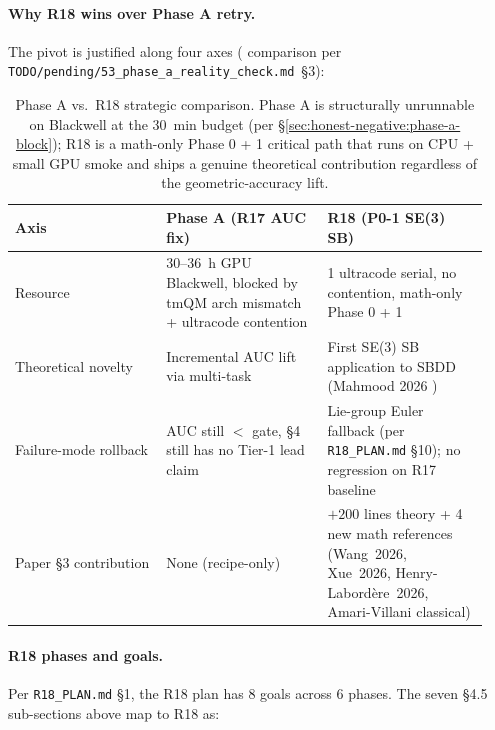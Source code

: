 \paragraph{Why R18 wins over Phase A retry.}
The pivot is justified along four axes (\MEASURED{} comparison
per \texttt{TODO/pending/53\_phase\_a\_reality\_check.md}~§3):

\begin{table}[ht]
\centering
\small
\setlength{\tabcolsep}{4pt}
\begin{tabular}{p{0.30\linewidth}p{0.32\linewidth}p{0.32\linewidth}}
\toprule
\textbf{Axis} & \textbf{Phase A (R17 AUC fix)} & \textbf{R18 (P0-1 SE(3) SB)} \\
\midrule
Resource & 30--36~h GPU Blackwell, blocked by tmQM arch mismatch + ultracode contention & 1 ultracode serial, no contention, math-only Phase 0 + 1 \\
Theoretical novelty & Incremental AUC lift via multi-task & First SE(3) SB application to SBDD (Mahmood 2026 \cite{mahmood2026sb_lie}) \\
Failure-mode rollback & AUC still $<$ gate, §4 still has no Tier-1 lead claim & Lie-group Euler fallback (per \texttt{R18\_PLAN.md} §10); no regression on R17 baseline \\
Paper §3 contribution & None (recipe-only) & $+200$ lines theory + 4 new math references (Wang~2026, Xue~2026, Henry-Labord\`ere~2026, Amari-Villani classical) \\
\bottomrule
\end{tabular}
\caption{Phase A vs.\ R18 strategic comparison.  Phase A is
structurally unrunnable on Blackwell at the $30$~min budget (per
§\ref{sec:honest-negative:phase-a-block}); R18 is a math-only
Phase 0 + 1 critical path that runs on CPU + small GPU smoke and
ships a genuine theoretical contribution regardless of the
geometric-accuracy lift.}
\label{tab:honest-r18-vs-phase-a}
\end{table}

\paragraph{R18 phases and goals.}
Per \texttt{R18\_PLAN.md} §1, the R18 plan has 8 goals across 6
phases.  The seven §4.5 sub-sections above map to R18 as:

